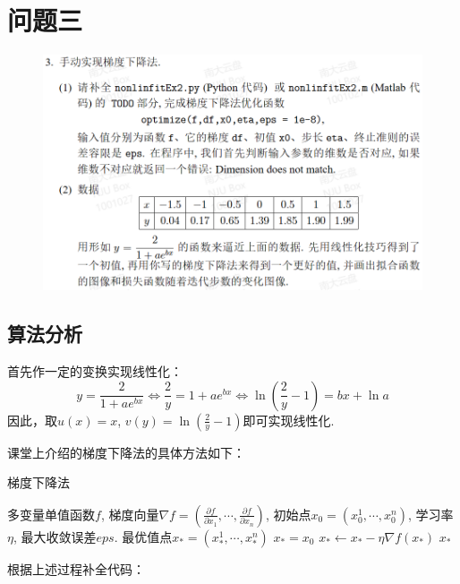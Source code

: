 \documentclass[UTF8,ctexart,a4paper,11pt,openany]{article}
\theoremstyle{definition}
\newcommand\e{\leftarrow}
\begin{document}
\section{问题三}
    \begin{figure}[H]
        \centering
        \includegraphics[width=\linewidth]{pics/7pro3.png}
        \end{figure}
    \subsection{算法分析}
    首先作一定的变换实现线性化：$$y=\frac{2}{1+a e^{b x}} \Leftrightarrow \frac{2}{y}=1+a e^{b x} \Leftrightarrow \ln \left(\frac{2}{y}-1\right)=bx+\ln a$$因此，取$u(x)=x$, $v(y)=\ln (\frac{2}{y}-1)$即可实现线性化. \par 课堂上介绍的梯度下降法的具体方法如下：
    \begin{algorithm}[H]
        \caption{梯度下降法}
        \begin{algorithmic} %
            \Require 多变量单值函数$f$, 梯度向量$\nabla f=(\frac{\partial f}{\partial x_1},\cdots,\frac{\partial f}{\partial x_n})$, 初始点$x_0=(x_0^1,\cdots,x_0^n)$, 学习率$\eta$, 最大收敛误差$eps$.
            \Ensure 最优值点$x_*=(x_*^1,\cdots,x_*^n)$
                \State $x_*=x_0$
                    \State $x_* \e x_* - \eta \nabla f(x_*)$
                \EndFor 
                \State \Return $x_*$ 
            \EndFunction
        \end{algorithmic}
    \end{algorithm}
    根据上述过程补全代码：
\end{document}
